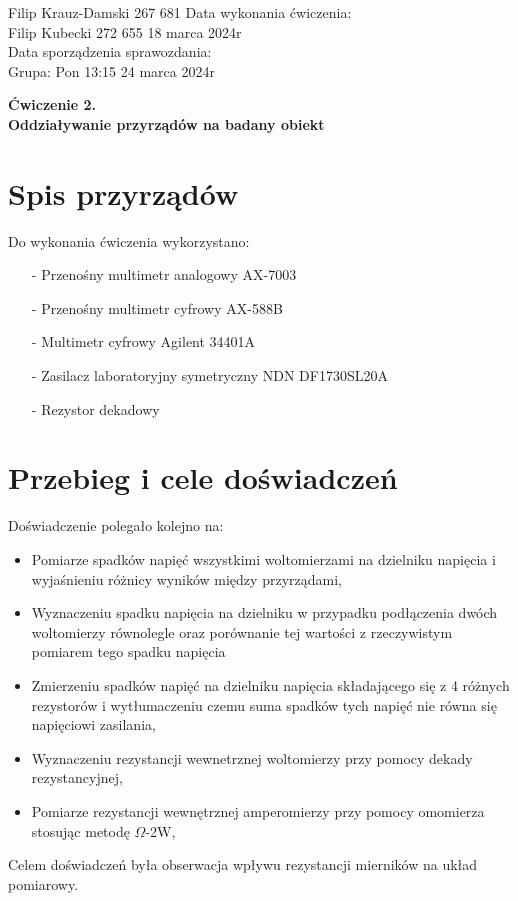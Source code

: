 \documentclass[11pt]{article}
\begin{document}
    \begin{flushleft}
        Filip Krauz-Damski 267 681 \hfill Data wykonania ćwiczenia:\\
        Filip Kubecki 272 655 \hfill 18 marca 2024r\\
        \hfill Data sporządzenia sprawozdania:\\
        Grupa: Pon 13:15 \hfill 24 marca 2024r\\
    \end{flushleft}
    \begin{center}
        \Large\textbf{Ćwiczenie 2.}\\
        \textbf{Oddziaływanie przyrządów na badany obiekt}
    \end{center}
    \vspace{1cm}

    \section{Spis przyrządów}
    \par{
        Do wykonania ćwiczenia wykorzystano:
        \begin{itemize}
            \setlength\itemsep{0em}
            \item[-] Przenośny multimetr analogowy AX-7003
            \item[-] Przenośny multimetr cyfrowy AX-588B
            \item[-] Multimetr cyfrowy Agilent 34401A
            \item[-] Zasilacz laboratoryjny symetryczny NDN DF1730SL20A
            \item[-] Rezystor dekadowy
        \end{itemize}
    }
    \section{Przebieg i cele doświadczeń}
    \noindent Doświadczenie polegało kolejno na:
    \begin{itemize}
        \setlength\itemsep{0em}
        \item Pomiarze spadków napięć wszystkimi woltomierzami na dzielniku napięcia i wyjaśnieniu różnicy wyników między przyrządami,
        \item Wyznaczeniu spadku napięcia na dzielniku w przypadku podłączenia dwóch woltomierzy równolegle oraz porównanie tej wartości z rzeczywistym pomiarem tego spadku napięcia
        \item Zmierzeniu spadków napięć na dzielniku napięcia składającego się z 4 różnych rezystorów i wytłumaczeniu czemu suma spadków tych napięć nie równa się napięciowi zasilania,
        \item Wyznaczeniu rezystancji wewnetrznej woltomierzy przy pomocy dekady rezystancyjnej,
        \item Pomiarze rezystancji wewnętrznej amperomierzy przy pomocy omomierza stosując metodę $\Omega$-2W,
    \end{itemize}
    Celem doświadczeń była obserwacja wpływu rezystancji mierników na układ pomiarowy.
\end{document}
